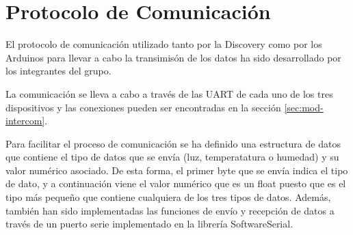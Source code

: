 \section{Protocolo de Comunicaci\'on}\label{sec:comunicacion}

El protocolo de comunicaci\'on utilizado tanto por la Discovery como
por los Arduinos para llevar a cabo la transimis\'on de los datos ha
sido desarrollado por los integrantes del grupo.

La comunicaci\'on se lleva a cabo a trav\'es de las UART de cada uno
de los tres dispositivos y las conexiones pueden ser encontradas en la
secci\'on \ref{sec:mod-intercom}.

Para facilitar el proceso de comunicaci\'on se ha definido una
estructura de datos que contiene el tipo de datos que se env\'ia (luz,
temperatatura o humedad) y su valor num\'erico asociado. De esta forma, el primer byte que se env\'ia indica el tipo de dato, y a continuaci\'on viene el valor num\'erico que es un float puesto que es el tipo m\'as peque\~no que contiene cualquiera de los tres tipos de datos. Adem\'as,
tambi\'en han sido implementadas las funciones de env\'io y
recepci\'on de datos a trav\'es de un puerto serie implementado en la
librer\'ia SoftwareSerial.

